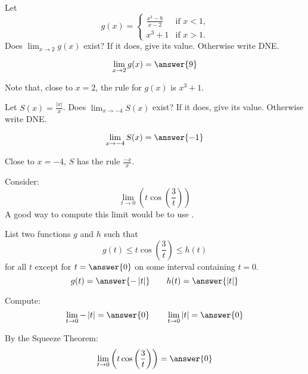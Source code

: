 \documentclass{ximera}
\begin{document}
\begin{exercise}

Let
\[
g(x) = \begin{cases}
  \frac{x^3 - 8}{x-2}  &\text{if $x<1$,} \\
  x^3+1 &\text{if  $x>1$.}
\end{cases}
\]
Does $\lim_{x \to 2} g(x)$ exist?  If it does, give its value.
Otherwise write DNE.
\begin{prompt}
\[
\lim_{x \to 2} g(x) = \answer{9}
\]
\end{prompt}
\begin{hint}
	Note that, close to $x=2$, the rule for $g(x)$ is $x^3+1$.
\end{hint}
\end{exercise}


\begin{exercise}

Let $S(x) = \frac{|x|}{x}$.  Does $\lim_{x \to -4} S(x)$ exist?  If it
does, give its value.  Otherwise write DNE.
\begin{prompt}
\[
\lim_{x \to -4} S(x) = \answer{-1}
\] 
\end{prompt}
\begin{hint}
  Close to $x=-4$, $S$ has the rule $\frac{-x}{x}$.
\end{hint}
\end{exercise}


\begin{exercise}


Consider:
\[
\lim_{t\to 0} \left(t \cos \left(\frac{3}{t}\right)\right)
\]
A good way to compute this limit would be to use .
\begin{exercise}
List two functions $g$ and $h$ such that
\[
g(t)\le t \cos \left(\frac{3}{t}\right) \le h(t)
\]
for all $t$ except for $t=\answer{0}$ on some interval containing $t=0$.
\[
g(t)=\answer{-\left| t\right|}\qquad h(t) =\answer{\left| t\right|}
\]
\begin{exercise}
Compute:
\[
\lim_{t \to 0}-\left| t\right| = \answer{0}\qquad \lim_{t\to 0}\left| t\right| = \answer{0}
\]
\begin{exercise}
By the Squeeze Theorem:
\[
\lim_{t\to 0} \left(t \cos \left(\frac{3}{t}\right)\right) = \answer{0}
\]
\end{exercise}
\end{exercise}
\end{exercise}
\end{exercise}
\end{document}
